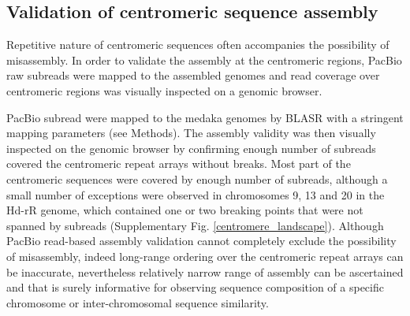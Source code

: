 

\subsection*{Validation of centromeric sequence assembly}
  Repetitive nature of centromeric sequences often accompanies the possibility of misassembly. In order to validate the assembly at the centromeric regions, PacBio raw subreads were mapped to the assembled genomes and read coverage over centromeric regions was visually inspected on a genomic browser.


  PacBio subread were mapped to the medaka genomes by BLASR \cite{} with a stringent mapping parameters (see Methods). The assembly validity was then visually inspected on the genomic browser by confirming enough number of subreads covered the centromeric repeat arrays without breaks. Most part of the centromeric sequences were covered by enough number of subreads, although a small number of exceptions were observed in chromosomes 9, 13 and 20 in the Hd-rR genome, which contained one or two breaking points that were not spanned by subreads (Supplementary Fig. \ref{centromere_landscape}). Although PacBio read-based assembly validation cannot completely exclude the possibility of misassembly, indeed long-range ordering over the centromeric repeat arrays can be inaccurate, nevertheless relatively narrow range of assembly can be ascertained and that is surely informative for observing sequence composition of a specific chromosome or inter-chromosomal sequence similarity.



